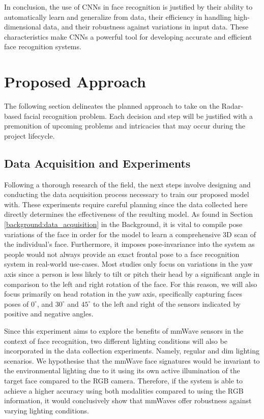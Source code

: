\documentclass{interim}
\begin{document}
In conclusion, the use of CNNs in face recognition is justified by their ability to automatically learn and generalize from data, their efficiency in handling high-dimensional data, and their robustness against variations in input data. These characteristics make CNNs a powerful tool for developing accurate and efficient face recognition systems.

\newpage
\section{Proposed Approach}
The following section delineates the planned approach to take on the Radar-based facial recognition problem. Each decision and step will be justified with a premonition of upcoming problems and intricacies that may occur during the project lifecycle.

\subsection{Data Acquisition and Experiments}
\label{approach:data_acquisition}
Following a thorough research of the field, the next steps involve designing and conducting the data acquisition process necessary to train our proposed model with. These experiments require careful planning since the data collected here directly determines the effectiveness of the resulting model. As found in Section \ref{background:data_acquisition} in the Background, it is vital to compile pose variations of the face in order for the model to learn a comprehensive 3D scan of the individual's face. Furthermore, it imposes pose-invariance into the system as people would not always provide an exact frontal pose to a face recognition system in real-world use-cases. Most studies only focus on variations in the yaw axis since a person is less likely to tilt or pitch their head by a significant angle in comparison to the left and right rotation of the face. For this reason, we will also focus primarily on head rotation in the yaw axis, specifically capturing faces poses of $0^\circ$, and $30^\circ$ and $45^\circ$ to the left and right of the sensors indicated by positive and negative angles. 

Since this experiment aims to explore the benefits of mmWave sensors in the context of face recognition, two different lighting conditions will also be incorporated in the data collection experiments. Namely, regular and dim lighting scenarios. We hypothesise that the mmWave face signatures would be invariant to the environmental lighting due to it using its own active illumination of the target face compared to the RGB camera. Therefore, if the system is able to achieve a higher accuracy using both modalities compared to using the RGB information, it would conclusively show that mmWaves offer robustness against varying lighting conditions.
\end{document}
